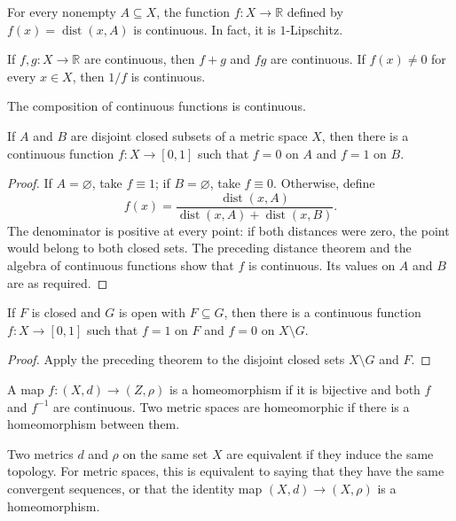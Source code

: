 \begin{cor}
For every nonempty $A\subseteq X$, the function
$f:X\to\mathbb{R}$ defined by $f(x)=\operatorname{dist}(x,A)$ is continuous.
In fact, it is $1$-Lipschitz.
\end{cor}

\begin{thm}
If $f,g:X\to\mathbb{R}$ are continuous, then $f+g$ and $fg$ are continuous.
If $f(x)\neq0$ for every $x\in X$, then $1/f$ is continuous.
\end{thm}

\begin{thm}
The composition of continuous functions is continuous.
\end{thm}

\begin{thm}
If $A$ and $B$ are disjoint closed subsets of a metric space $X$, then there
is a continuous function $f:X\to[0,1]$ such that $f=0$ on $A$ and $f=1$ on
$B$.
\end{thm}

\begin{proof}
If $A=\varnothing$, take $f\equiv1$; if $B=\varnothing$, take $f\equiv0$.
Otherwise, define
\[
f(x)=\frac{\operatorname{dist}(x,A)}
{\operatorname{dist}(x,A)+\operatorname{dist}(x,B)}.
\]
The denominator is positive at every point: if both distances were zero, the
point would belong to both closed sets. The preceding distance theorem and
the algebra of continuous functions show that $f$ is continuous. Its values
on $A$ and $B$ are as required.
\end{proof}

\begin{cor}
If $F$ is closed and $G$ is open with $F\subseteq G$, then there is a
continuous function $f:X\to[0,1]$ such that $f=1$ on $F$ and $f=0$ on
$X\setminus G$.
\end{cor}

\begin{proof}
Apply the preceding theorem to the disjoint closed sets $X\setminus G$ and
$F$.
\end{proof}

\begin{de}
A map $f:(X,d)\to(Z,\rho)$ is a homeomorphism if it is bijective and both
$f$ and $f^{-1}$ are continuous. Two metric spaces are homeomorphic if there
is a homeomorphism between them.

Two metrics $d$ and $\rho$ on the same set $X$ are equivalent if they induce
the same topology. For metric spaces, this is equivalent to saying that they
have the same convergent sequences, or that the identity map
$(X,d)\to(X,\rho)$ is a homeomorphism.
\end{de}

